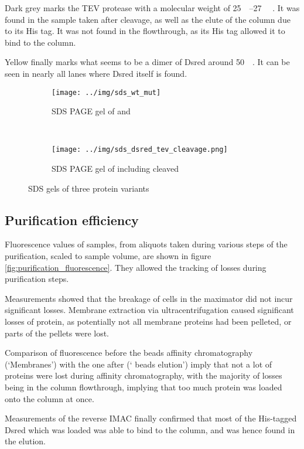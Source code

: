 Dark grey marks the TEV protease with a molecular weight of
\SIrange{25}{27}{\kilo\Da} \cite{pdb}. It was found in the sample taken after
cleavage, as well as the elute of the column due to its His tag. It was not
found in the flowthrough, as its His tag allowed it to bind to the column.

Yellow finally marks what seems to be a dimer of Dsred around
\SI{50}{\kilo\Da}. It can be seen in nearly all lanes where Dsred itself is
found.

\begin{figure*}
    \centering
    \begin{subfigure}{0.45\textwidth}
        \texttt{[image: ../img/sds\_wt\_mut]}
	\caption{SDS PAGE gel of \hs{} and \hsmut{}}
        \label{fig:sds_wt_mut}
    \end{subfigure}
    ~
    \begin{subfigure}{0.45\textwidth}
        \texttt{[image: ../img/sds\_dsred\_tev\_cleavage.png]}
	\caption{SDS PAGE gel of \hsdsred{} including cleaved \hsdsred{}}
        \label{fig:sds_dsred_cleaved}
    \end{subfigure}
    \caption{SDS gels of three protein variants}
    \label{fig:sds}
\end{figure*}

\subsection{Purification efficiency}

Fluorescence values of \hsdsred{} samples, from aliquots taken during various
steps of the purification, scaled to sample volume, are shown in figure
\ref{fig:purification_fluorescence}. They allowed the tracking of losses during
purification steps.

Measurements showed that the breakage of cells in the maximator did not incur
significant losses. Membrane extraction via ultracentrifugation caused
significant losses of protein, as potentially not all membrane proteins had
been pelleted, or parts of the pellets were lost.

Comparison of fluorescence before the  beads affinity chromatography
(`Membranes') with the one after (` beads elution') imply that not a lot
of proteins were lost during affinity chromatography, with the majority of
losses being in the column flowthrough, implying that too much protein was
loaded onto the column at once.

Measurements of the reverse IMAC finally confirmed that most of the His-tagged
Dsred which was loaded was able to bind to the column, and was hence found in
the elution.

